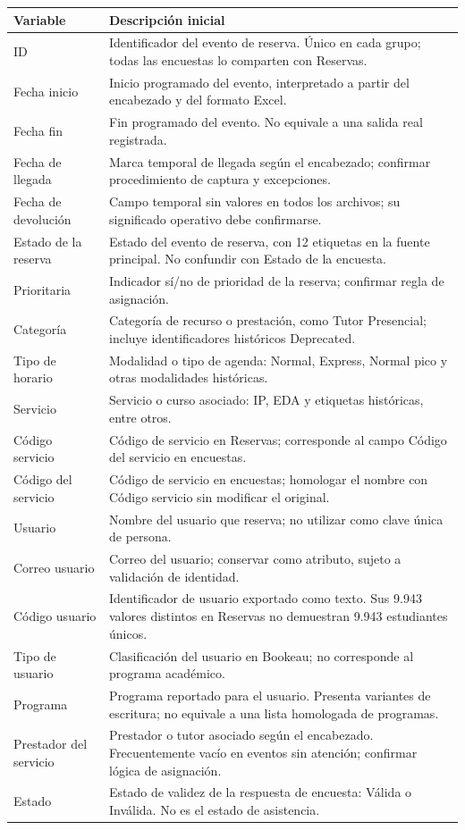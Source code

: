 \documentclass[11pt,letterpaper]{article}
\begin{document}
\begingroup\small\setlength{\tabcolsep}{4pt}\renewcommand{\arraystretch}{1.15}
\begin{longtable}{>{\raggedright\arraybackslash}p{}>{\raggedright\arraybackslash}p{}}
\toprule
\textbf{Variable} & \textbf{Descripción inicial} \\
\midrule
\endhead
ID & Identificador del evento de reserva. Único en cada grupo; todas las encuestas lo comparten con Reservas. \\
Fecha inicio & Inicio programado del evento, interpretado a partir del encabezado y del formato Excel. \\
Fecha fin & Fin programado del evento. No equivale a una salida real registrada. \\
Fecha de llegada & Marca temporal de llegada según el encabezado; confirmar procedimiento de captura y excepciones. \\
Fecha de devolución & Campo temporal sin valores en todos los archivos; su significado operativo debe confirmarse. \\
Estado de la reserva & Estado del evento de reserva, con 12 etiquetas en la fuente principal. No confundir con Estado de la encuesta. \\
Prioritaria & Indicador sí/no de prioridad de la reserva; confirmar regla de asignación. \\
Categoría & Categoría de recurso o prestación, como Tutor Presencial; incluye identificadores históricos Deprecated. \\
Tipo de horario & Modalidad o tipo de agenda: Normal, Express, Normal pico y otras modalidades históricas. \\
Servicio & Servicio o curso asociado: IP, EDA y etiquetas históricas, entre otros. \\
Código servicio & Código de servicio en Reservas; corresponde al campo Código del servicio en encuestas. \\
Código del servicio & Código de servicio en encuestas; homologar el nombre con Código servicio sin modificar el original. \\
Usuario & Nombre del usuario que reserva; no utilizar como clave única de persona. \\
Correo usuario & Correo del usuario; conservar como atributo, sujeto a validación de identidad. \\
Código usuario & Identificador de usuario exportado como texto. Sus 9.943 valores distintos en Reservas no demuestran 9.943 estudiantes únicos. \\
Tipo de usuario & Clasificación del usuario en Bookeau; no corresponde al programa académico. \\
Programa & Programa reportado para el usuario. Presenta variantes de escritura; no equivale a una lista homologada de programas. \\
Prestador del servicio & Prestador o tutor asociado según el encabezado. Frecuentemente vacío en eventos sin atención; confirmar lógica de asignación. \\
Estado & Estado de validez de la respuesta de encuesta: Válida o Inválida. No es el estado de asistencia. \\
\bottomrule
\end{longtable}
\end{document}
